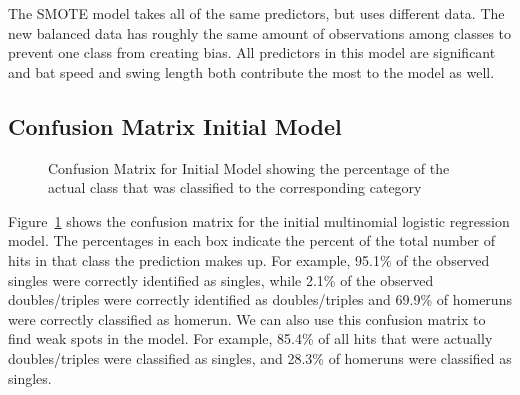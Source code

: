 \documentclass[
  letterpaper,
  DIV=11,
  numbers=noendperiod]{scrartcl}
\begin{document}
The SMOTE model takes all of the same predictors, but uses different
data. The new balanced data has roughly the same amount of observations
among classes to prevent one class from creating bias. All predictors in
this model are significant and bat speed and swing length both
contribute the most to the model as well.

\subsection{Confusion Matrix Initial
Model}\label{confusion-matrix-initial-model}

\begin{figure}[H]


\caption{\label{fig-confusion-initial}Confusion Matrix for Initial Model
showing the percentage of the actual class that was classified to the
corresponding category}

\end{figure}%

Figure~\ref{fig-confusion-initial} shows the confusion matrix for the
initial multinomial logistic regression model. The percentages in each
box indicate the percent of the total number of hits in that class the
prediction makes up. For example, 95.1\% of the observed singles were
correctly identified as singles, while 2.1\% of the observed
doubles/triples were correctly identified as doubles/triples and 69.9\%
of homeruns were correctly classified as homerun. We can also use this
confusion matrix to find weak spots in the model. For example, 85.4\% of
all hits that were actually doubles/triples were classified as singles,
and 28.3\% of homeruns were classified as singles.
\end{document}
